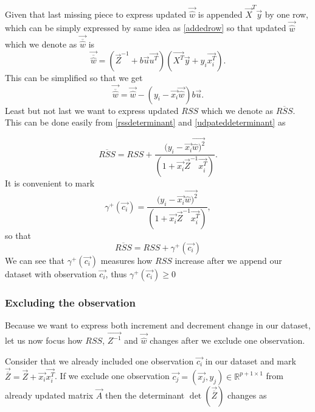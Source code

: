 Given that last missing piece to express updated $\vec{\hat{w}}$ is appended $\vec{X}^T\vec{y}$ by one row, which can be simply expressed by same idea as \eqref{addedrow} so that updated $\vec{\hat{w}}$ which we denote as $\vec{\overline{\hat{w}}}$ is 
\begin{equation}
    \vec{\overline{\hat{w}}} = (\vec{Z}^{-1} + b\vec{u}\vec{u^T})(\vec{X^T}\vec{y} + y_i\vec{x_i^T}).
\end{equation}
This can be simplified so that we get
\begin{equation} \label{thetaplus}
    \vec{\overline{\hat{w}}} = \vec{\hat{w}} - (y_i - \vec{x_i}\vec{\hat{w}})b\vec{u}.
\end{equation}
Least but not last we want to express updated $RSS$ which we denote as $\overline{RSS}$. This can be done easily from \ref{rssdeterminant} and \ref{udpateddeterminant} as 

\begin{equation}
    \overline{RSS} =  RSS + \dfrac{(y_i - \vec{x_i}\vec{\hat{w})^2}}{(1 + \vec{x_i}\vec{Z}^{-1}\vec{x_i^T})}.
\end{equation}
It is convenient to mark 
\begin{equation} \label{gamma:plus}
    \gamma^{+}(\vec{c_i}) = \dfrac{(y_i - \vec{x_i}\vec{\hat{w})^2}}{(1 + \vec{x_i}\vec{Z}^{-1}\vec{x_i^T})},
\end{equation}
so that 
\begin{equation} \label{rssplus}
    \overline{RSS} =  RSS + \gamma^{+}(\vec{c_i})
\end{equation}
We can see that $\gamma^{+}(\vec{c_i})$ measures how $RSS$ increase after we append our dataset with observation $\vec{c_i}$, thus $\gamma^{+}(\vec{c_i}) \geq 0$




\subsubsection*{Excluding the observation}

Because we want to express both increment and decrement change in our dataset, let us now focus how $RSS$, $\vec{Z^{-1}}$ and $\vec{\hat{w}}$  changes after we exclude one observation. 

Consider that we already included one observation $\vec{c_i}$ in our dataset and mark $\vec{\overline{Z}} = \vec{Z} + \vec{x_i} \vec{x_i^T} $. If we exclude one observation $\vec{c_j} = (\vec{x_j}, y_j) \in \mathbb{R}^{p+1 \times 1} $ from already updated matrix $\vec{A}$ then the determinant $\det(\vec{\overline{Z}})$  changes as


